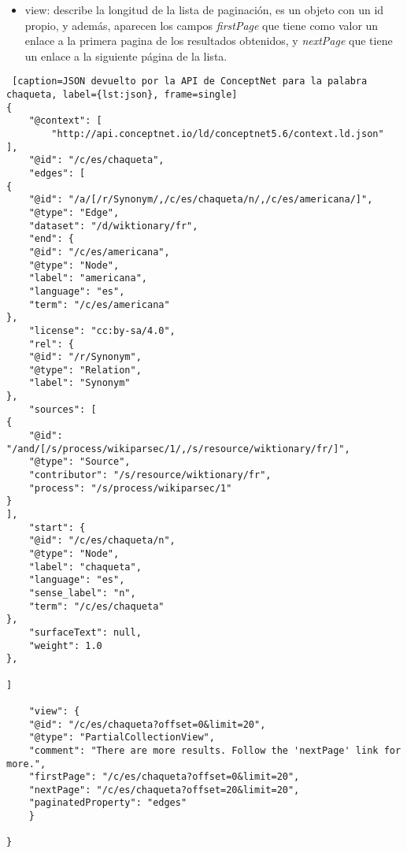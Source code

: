 \begin{itemize}
\begin{itemize}
		\item start: describe el nodo origen, es decir, la palabra que hemos introducido en ConceptNet para que haga la consulta, este campo esta compuesto por elementos ya descritos como son: @id, @type, label, language y term.
		\item surfaceText: algunos datos de ConceptNet se extraen de texto en lenguaje natural. El valor de surface text muestra lo que era este texto, puede que este campo tenga valor nulo.
		\item weight: indica la fiabilidad de la información guardada en conceptnet, siendo normal que su valor sea 1.0. Cuanto mayor sea este valor, más fiables serán.
	\end{itemize}
	\item view: describe la longitud de la lista de paginación, es un objeto con un id propio, y además, aparecen los campos \textit{firstPage} que tiene como valor un enlace a la primera pagina de los resultados obtenidos, y \textit{nextPage} que tiene un enlace a la siguiente página de la lista.
\end{itemize}


\begin{lstlisting} [caption=JSON devuelto por la API de ConceptNet para la palabra chaqueta, label={lst:json}, frame=single]
{
	"@context": [
		"http://api.conceptnet.io/ld/conceptnet5.6/context.ld.json"
],
	"@id": "/c/es/chaqueta",
	"edges": [
{
	"@id": "/a/[/r/Synonym/,/c/es/chaqueta/n/,/c/es/americana/]",
	"@type": "Edge",
	"dataset": "/d/wiktionary/fr",
	"end": {
	"@id": "/c/es/americana",
	"@type": "Node",
	"label": "americana",
	"language": "es",
	"term": "/c/es/americana"
},
	"license": "cc:by-sa/4.0",
	"rel": {
	"@id": "/r/Synonym",
	"@type": "Relation",
	"label": "Synonym"
},
	"sources": [
{
	"@id": "/and/[/s/process/wikiparsec/1/,/s/resource/wiktionary/fr/]",
	"@type": "Source",
	"contributor": "/s/resource/wiktionary/fr",
	"process": "/s/process/wikiparsec/1"
}
],
	"start": {
	"@id": "/c/es/chaqueta/n",
	"@type": "Node",
	"label": "chaqueta",
	"language": "es",
	"sense_label": "n",
	"term": "/c/es/chaqueta"
},
	"surfaceText": null,
	"weight": 1.0
},

]

	"view": {
	"@id": "/c/es/chaqueta?offset=0&limit=20",
	"@type": "PartialCollectionView",
	"comment": "There are more results. Follow the 'nextPage' link for more.",
	"firstPage": "/c/es/chaqueta?offset=0&limit=20",
	"nextPage": "/c/es/chaqueta?offset=20&limit=20",
	"paginatedProperty": "edges"
	}

}
\end{lstlisting} 


